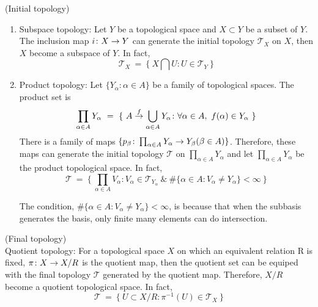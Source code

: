 \documentclass[a4paper,11pt]{report}
\begin{document}
\begin{exam}
	(Initial topology)
	\begin{enumerate}[label=\arabic*)]
		\item Subspace topology: Let $Y$ be a topological space and $X \subset Y$ be a subset of $Y$. The inclusion map $i \colon X \rightarrow Y$ can generate the initial topology $\mathscr{T}_X$ on $X$, then $X$ become a subspace of $Y$. In fact,
		\begin{equation*}
			\mathscr{T}_X ~=~ \{~X \bigcap U \colon U \in \mathscr{T}_Y~\}
		\end{equation*}
		\item Product topology: Let $\{Y_\alpha \colon \alpha \in A\}$ be a family of topological spaces. The product set is 
		\begin{equation*}
			\prod_{\alpha \in A} Y_\alpha ~=~ \{~A \stackrel{f}{\rightarrow} \bigcup_{\alpha \in A} Y_\alpha \colon \forall \alpha \in A,~ f(\alpha) \in Y_\alpha ~\}
		\end{equation*}
		There is a family of maps $\{ p_\beta \colon \prod_{\alpha \in A} Y_\alpha \rightarrow Y_\beta (\beta \in A) \}$. Therefore, these maps can generate the initial topology $\mathscr{T}$ on $\prod_{\alpha \in A} Y_\alpha$ and let $\prod_{\alpha \in A} Y_\alpha$ be the product topological space. In fact,
		\begin{equation*}
			\mathscr{T} ~=~ \{~\prod_{\alpha \in A} V_\alpha \colon V_\alpha \in \mathscr{T}_{Y_\alpha} ~ \& ~ \#\{\alpha \in A \colon V_\alpha \neq Y_\alpha \} < \infty ~\}
		\end{equation*}
		\begin{rem}
			The condition, $\#\{ \alpha \in A \colon V_\alpha \neq Y_\alpha \} < \infty$, is because that when the subbasis generates the basis, only finite many elements can do intersection.
		\end{rem}
	\end{enumerate}
\end{exam}
\begin{exam}
	(Final topology)\\
	Quotient topology: For a topological space $X$ on which an equivalent relation R is fixed, $\pi \colon X \rightarrow X/R$ is the quotient map, then the quotient set can be equiped with the final topology $\mathscr{T}$ generated by the quotient map. Therefore, $X/R$ become a quotient topological space. In fact,
	\begin{equation*}
		\mathscr{T} ~=~ \{~ U \subset X/R \colon \pi^{-1}(U) \in \mathscr{T}_X ~\}
	\end{equation*}
\end{exam}
\end{document}
